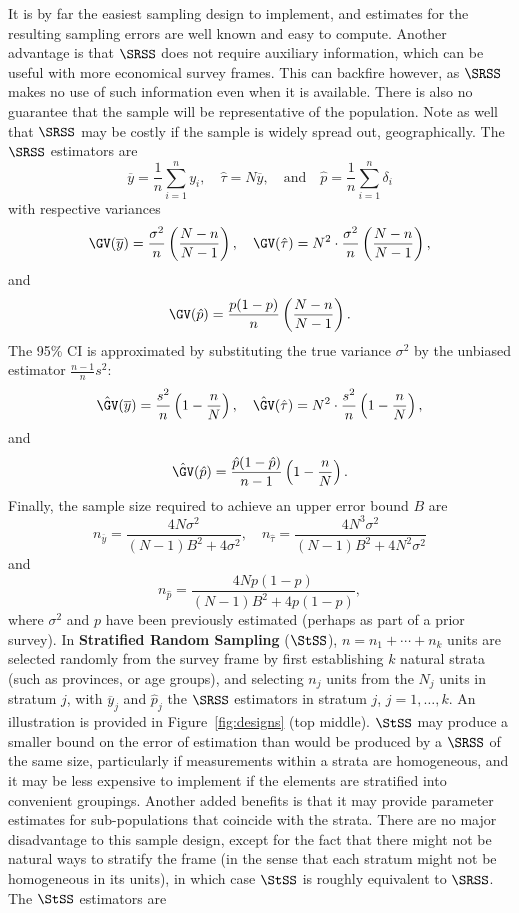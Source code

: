 \afterpage{\FloatBarrier}
It is by far the easiest sampling design to implement, and estimates for the resulting sampling errors are well known and easy to compute. Another advantage is that $\SRSS$ does not require auxiliary information, which can be useful with more economical survey frames. \newl This can backfire however, as $\SRSS$ makes no use of such information even when it is available. There is also no guarantee that the sample will be representative of the population. Note as well that $\SRSS$ may be costly if the sample is widely spread out, geographically.\newl 
The $\SRSS$ estimators are 
$$\overline{y}=\frac{1}{n}\sum_{i=1}^n y_i, \quad \hat{\tau}=N\overline{y}, \quad\mbox{and}\quad \hat{p}=\frac{1}{n}\sum_{i=1}^n \delta_i$$ with respective variances
$$\GV(\overline{y})=\frac{\sigma^2}{n}\left(\frac{N-n}{N-1}\right),\quad \GV(\hat{\tau})=N^2\cdot\frac{\sigma^2}{n}\left(\frac{N-n}{N-1}\right),$$ and $$\GV(\hat{p})=\frac{p(1-p)}{n}\left(\frac{N-n}{N-1}\right).$$
The 95\% CI is approximated by substituting the true variance $\sigma^2$ by the unbiased estimator $\frac{n-1}{n}s^2$: $$\hat{\GV}(\overline{y})=\frac{s^2}{n}\left(1-\frac{n}{N}\right), \quad
\hat{\GV}(\hat{\tau})=N^2\cdot\frac{s^2}{n}\left(1-\frac{n}{N}\right),$$ and $$\hat{\GV}(\hat{p})=\frac{\hat{p}(1-\hat{p})}{n-1}\left(1-\frac{n}{N}\right).$$
Finally, the sample size required to achieve an upper error bound $B$ are $$n_{\overline{y}}=\frac{4N\sigma^2}{(N-1)B^2+4\sigma^2},\quad n_{\hat{\tau}}=\frac{4N^3\sigma^2}{(N-1)B^2+4N^2\sigma^2}$$ and $$n_{\hat{p}}=\frac{4Np(1-p)}{(N-1)B^2+4p(1-p)},$$ where $\sigma^2$ and $p$ have been previously estimated (perhaps as part of a prior survey). \newl 
In \textbf{Stratified Random Sampling} ($\StSS$), $n=n_1+\cdots+n_k$ units are selected randomly from the survey frame by first establishing $k$ natural strata (such as provinces, or age groups), and selecting $n_j$ units from the $N_j$ units in stratum $j$, with $\overline{y}_j$ and $\hat{p}_j$ the $\SRSS$ estimators in stratum $j$, $j=1,\ldots, k$. An illustration is provided in Figure~\ref{fig:designs} (top middle). \newpage\noindent $\StSS$ may produce a smaller bound on the error of estimation than would be produced by a $\SRSS$ of the same size, particularly if measurements within a strata are homogeneous, and it may be less expensive to implement if the elements are stratified into convenient groupings. Another added benefits is that it may provide parameter estimates for sub-populations that coincide with the strata. There are no major disadvantage to this sample design, except for the fact that there might not be natural ways to stratify the frame (in the sense that each stratum might not be homogeneous in its units), in which case $\StSS$ is roughly equivalent to $\SRSS$. \newl The $\StSS$ estimators are 
